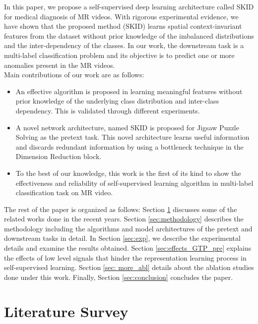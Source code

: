 \documentclass[journal]{IEEEtai}
\begin{document}
\indent
In this paper, we propose a self-supervised deep learning architecture called SKID for medical diagnosis of MR videos. With rigorous experimental evidence, we have shown that the proposed method (SKID) learns spatial context-invariant features from the dataset without prior knowledge of the imbalanced distributions and the inter-dependency of the classes. In our work, the downstream task is a multi-label classification problem and its objective is to predict one or more anomalies present in the MR videos. \\
\indent
Main contributions of our work are as follows:
\begin{itemize}
    \item An effective algorithm is proposed in learning meaningful features without prior knowledge of the underlying class distribution and inter-class dependency. This is validated through different experiments.
    \item A novel network architecture, named SKID is proposed for Jigsaw Puzzle Solving as the pretext task. This novel architecture learns useful information and discards redundant information by using a bottleneck technique in the Dimension Reduction block.
    \item To the best of our knowledge, this work is the first of its kind to show the effectiveness and reliability of self-supervised learning algorithm in multi-label classification task on MR video.
\end{itemize}

The rest of the paper is organized as follows: Section \ref{sec:litsurvey} discusses some of the related works done in the recent years. Section \ref{sec:methodology} describes the methodology including the algorithms and model architectures of the pretext and downstream tasks in detail. In Section \ref{sec:exp}, we describe the experimental details and examine the results obtained. Section \ref{sec:effects_GTP_pre} explains the effects of low level signals that hinder the representation learning process in self-supervised learning. Section \ref{sec: more_abl} details about the ablation studies done under this work. Finally, Section \ref{sec:conclusion} concludes the paper.

\section{Literature Survey}
\label{sec:litsurvey}
\end{document}

